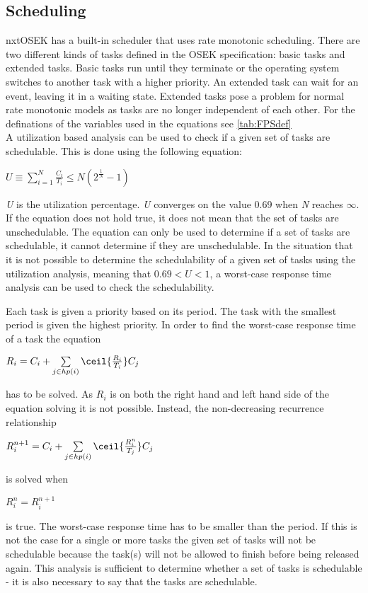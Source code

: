 \subsection{Scheduling}\label{sec:scheduling}
nxtOSEK has a built-in scheduler that uses rate monotonic scheduling. There are two different kinds of tasks defined in the OSEK specification: basic tasks and extended tasks. Basic tasks run until they terminate or the operating system switches to another task with a higher priority. An extended task can wait for an event, leaving it in a waiting state. Extended tasks pose a problem for normal rate monotonic models as tasks are no longer independent of each other. For the definations of the variables used in the equations see \cref{tab:FPSdef}\\



A utilization based analysis can be used to check if a given set of tasks are schedulable. This is done using the following equation: \\ \begin{center}$U \equiv \sum\limits_{i=1}^N \frac{C_i}{T_i} \leq N(2^\frac{1}{N} - 1)$ \end{center}
\textit{U} is the utilization percentage. \textit{U} converges on the value 0.69 when \textit{N} reaches $\infty$. If the equation does not hold true, it does not mean that the set of tasks are unschedulable. The equation can only be used to determine if a set of tasks are schedulable, it cannot determine if they are unschedulable. In the situation that it is not possible to determine the schedulability of a given set of tasks using the utilization analysis, meaning that $0.69 < U < 1$, a worst-case response time analysis can be used to check the schedulability.

Each task is given a priority based on its period. The task with the smallest period is given the highest priority. In order to find the worst-case response time of a task the equation \\
\begin{center}$R_i = C_i + \sum\limits_{j\in{}hp(i)} \ceil{\frac{R_i}{T_i}} C_j$\end{center}
has to be solved. As $R_i$ is on both the right hand and left hand side of the equation solving it is not possible. Instead, the non-decreasing recurrence relationship \\ 
\begin{center}$R_i^{n+1} = C_i + \sum\limits_{j\in{}hp(i)} \ceil{\frac{R_i^n}{T_j}} C_j$\end{center}
is solved when \\ 
\begin{center}$R_i^n = R_i^{n+1}$\end{center}
is true. The worst-case response time has to be smaller than the period. If this is not the case for a single or more tasks the given set of tasks will not be schedulable because the task(s) will not be allowed to finish before being released again. This analysis is sufficient to determine whether a set of tasks is schedulable - it is also necessary to say that the tasks are schedulable. \\ 

